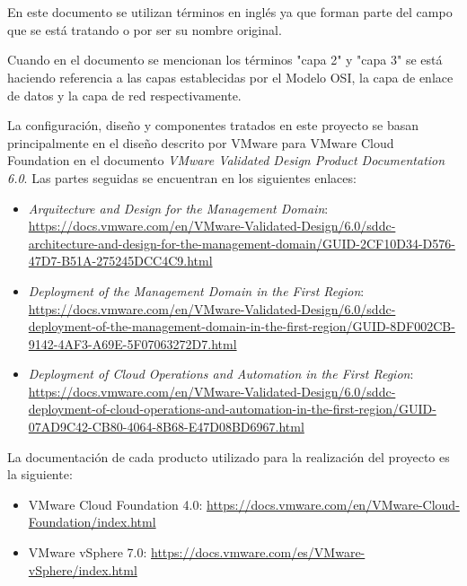 \chapter*{\nomeanexonotas}
\label{chap:notas}
\begin{description}

    \item En este documento se utilizan términos en inglés ya que forman parte del campo que se está tratando o por ser su nombre original.
    \item Cuando en el documento se mencionan los términos "capa 2" y "capa 3" se está haciendo referencia a las capas establecidas por el Modelo OSI, la capa de enlace de datos y la capa de red respectivamente.
    \item La configuración, diseño y componentes tratados en este proyecto se basan principalmente en el diseño descrito por VMware para VMware Cloud Foundation en el documento \textit{VMware Validated Design Product Documentation 6.0}. Las partes seguidas se encuentran en los siguientes enlaces: 
        \begin{itemize}
            \item \textit{Arquitecture and Design for the Management Domain}: \url{https://docs.vmware.com/en/VMware-Validated-Design/6.0/sddc-architecture-and-design-for-the-management-domain/GUID-2CF10D34-D576-47D7-B51A-275245DCC4C9.html}
            \item \textit{Deployment of the Management Domain in the First Region}: \url{https://docs.vmware.com/en/VMware-Validated-Design/6.0/sddc-deployment-of-the-management-domain-in-the-first-region/GUID-8DF002CB-9142-4AF3-A69E-5F07063272D7.html}
            \item \textit{Deployment of Cloud Operations and Automation in the First Region}: \url{https://docs.vmware.com/en/VMware-Validated-Design/6.0/sddc-deployment-of-cloud-operations-and-automation-in-the-first-region/GUID-07AD9C42-CB80-4064-8B68-E47D08BD6967.html}
        \end{itemize}
    \item La documentación de cada producto utilizado para la realización del proyecto es la siguiente:
        \begin{itemize}
            \item VMware Cloud Foundation 4.0: \url{https://docs.vmware.com/en/VMware-Cloud-Foundation/index.html}
            \item VMware vSphere 7.0: \url{https://docs.vmware.com/es/VMware-vSphere/index.html}

\end{itemize}
\end{description}
